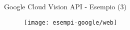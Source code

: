 %
\begin{frame}[t]{Google Cloud Vision API - Esempio (3)}
	\begin{figure}[h]
	\centering
	    \texttt{[image: esempi-google/web]}
		\label{fig:esempio-google-3}
	\end{figure}
\end{frame}
%
